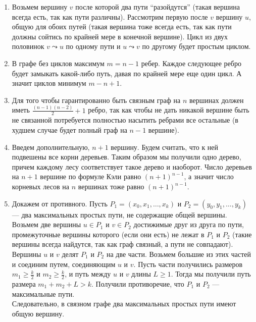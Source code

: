 \documentclass[10pt]{article}
\begin{document}
\begin{enumerate}
	\item Возьмем вершину $v$ после которой два пути ``разойдутся'' (такая вершина всегда есть, так как пути различны). Рассмотрим первую после $v$ вершину $u$, общую для обоих путей (такая вершина тоже всегда есть, так как пути должны сойтись по крайней мере в конечной вершине). Цикл из двух половинок $v \leadsto u$ по одному пути и $u \leadsto v$ по другому будет простым циклом.
	
	\item В графе без циклов максимум $m=n-1$ ребер. Каждое следующее ребро будет замыкать какой-либо путь, давая по крайней мере  еще один цикл. А значит циклов минимум $m-n+1$.
	
	\item Для того чтобы гарантированно быть связным граф на $n$ вершинах должен иметь $\frac{(n-1)(n-2)}{2} + 1$ ребро, так как чтобы не дать никакой вершине быть не связанной потребуется полностью насытить ребрами все остальные (в худшем случае будет полный граф на $n-1$ вершине).
	
	\item Введем дополнительную, $n+1$ вершину. Будем считать, что к ней подвешены все корни деревьев. Таким образом мы получили одно дерево, причем каждому лесу соответствует такое дерево и наоборот. Число деревьев на $n+1$ вершине по формуле Кэли равно $(n+1)^{n-1}$, а значит число корневых лесов на $n$ вершинах тоже равно $(n+1)^{n-1}$.
	
	\item Докажем от противного. Пусть $P_1=(x_0,x_1,\ldots,x_k)$ и $P_2=(y_0, y_1, \ldots, y_k)$ --- два максимальных простых пути, не содержащие общей вершины. Возьмем две вершины $u \in P_1$ и $v \in P_2$ достижимые друг из друга по пути, промежуточные вершины которого (если они есть) не лежат в $P_1$ и $P_2$ (такие вершины всегда найдутся, так как граф связный, а пути не совпадают). Вершины $u$ и $v$ делят $P_1$ и $P_2$ на две части. Возьмем большие из этих частей и соединим путем, соединяющим $u$ и $v$. Пусть части получились размеров $m_1 \ge \frac{k}{2}$ и $m_2 \ge \frac{k}{2}$, и путь между $u$ и $v$ длины $L \ge 1$. Тогда мы получили путь размера $m_1 + m_2 + L > k$. Получили противоречие, что $P_1$ и $P_2$ --- максимальные пути.\\
	Следовательно, в связном графе два максимальных простых пути имеют общую вершину.
\end{enumerate}
\end{document}

